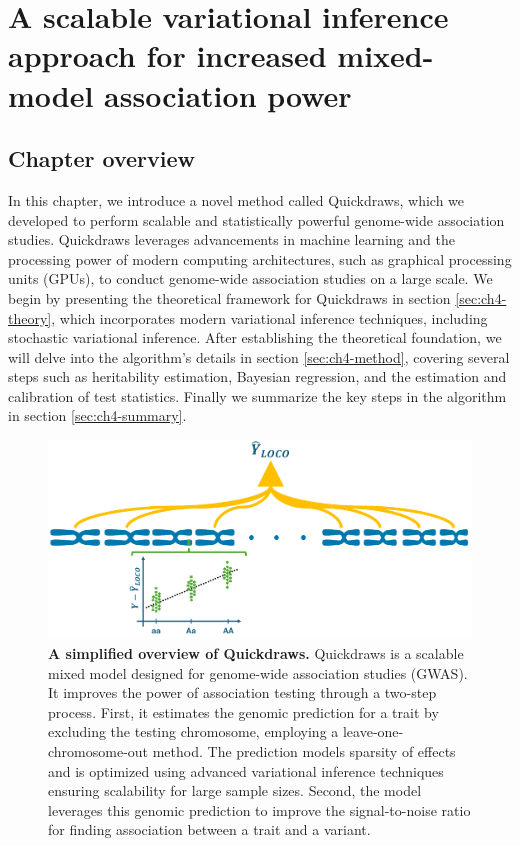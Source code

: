 \chapter{\label{ch:4-qd-method}A scalable variational inference approach for increased mixed-model association power}

\minitoc

\section{Chapter overview}
In this chapter, we introduce a novel method called Quickdraws, which we developed to perform scalable and statistically powerful genome-wide association studies. Quickdraws leverages advancements in machine learning and the processing power of modern computing architectures, such as graphical processing units (GPUs), to conduct genome-wide association studies on a large scale. We begin by presenting the theoretical framework for Quickdraws in section \ref{sec:ch4-theory}, which incorporates modern variational inference techniques, including stochastic variational inference. After establishing the theoretical foundation, we will delve into the algorithm's details in section \ref{sec:ch4-method}, covering several steps such as heritability estimation, Bayesian regression, and the estimation and calibration of test statistics. Finally we summarize the key steps in the algorithm in section \ref{sec:ch4-summary}.

\begin{figure}[h!]
    \centering
    \includegraphics[width=\textwidth]{figures/thesis_qd_simplified_overview.pdf}
    \caption{\textbf{A simplified overview of Quickdraws.} Quickdraws is a scalable mixed model designed for genome-wide association studies (GWAS). It improves the power of association testing through a two-step process. First, it estimates the genomic prediction for a trait by excluding the testing chromosome, employing a leave-one-chromosome-out method. The prediction models sparsity of effects and is optimized using advanced variational inference techniques ensuring scalability for large sample sizes. Second, the model leverages this genomic prediction to improve the signal-to-noise ratio for finding association between a trait and a variant.}
    \label{fig:qd-simplified-overview}
\end{figure}

